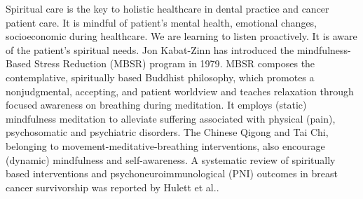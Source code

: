 \documentclass[jpm,article,submit,moreauthors,pdftex]{Definitions/mdpi}
\begin{document}
\begin{paracol}{2}
Spiritual care is the key to holistic healthcare in dental practice\cite{Ling-ChengMong2021} and cancer patient care\cite{Hulett2016}. 
It is mindful of patient's mental health, emotional changes, socioeconomic during healthcare.  %
We are learning to listen proactively.
It is aware of the patient's spiritual needs.
Jon Kabat-Zinn has introduced the mindfulness-Based Stress Reduction (MBSR) program in 1979\cite{Niazi2011}. MBSR composes the contemplative, spiritually based Buddhist philosophy, which promotes a nonjudgmental, accepting, and patient worldview and teaches relaxation through focused awareness on breathing during meditation. It employs (static) mindfulness meditation to alleviate suffering associated with physical (pain), psychosomatic and psychiatric disorders.
The Chinese Qigong and Tai Chi, belonging to movement-meditative-breathing interventions, also encourage (dynamic) mindfulness and self-awareness. 
A systematic review of spiritually based interventions and psychoneuroimmunological (PNI) outcomes in breast cancer survivorship was reported by Hulett et al.\cite{Hulett2016}. 

\end{paracol}
\end{document}
